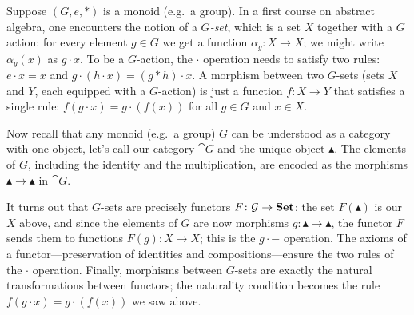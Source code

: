 \documentclass[Book-Poly]{subfiles}
\begin{document}
\begin{example}
Suppose $(G,e,*)$ is a monoid (e.g.\ a group). In a first course on abstract algebra, one encounters the notion of a \emph{$G$-set}, which is a set $X$ together with a $G$ action: for every element $g\in G$ we get a function $\alpha_g\colon X\to X$; we might write $\alpha_g(x)$ as $g\cdot x$. To be a $G$-action, the $\cdot$ operation needs to satisfy two rules: $e\cdot x=x$ and $g\cdot(h\cdot x)=(g*h)\cdot x$. A morphism between two $G$-sets (sets $X$ and $Y$, each equipped with a $G$-action) is just a function $f\colon X\to Y$ that  satisfies a single rule: $f(g\cdot x)=g\cdot (f(x))$ for all $g\in G$ and $x\in X$.

Now recall that any monoid (e.g.\ a group) $G$ can be understood as a category with one object, let's call our category $\cat{G}$ and the unique object $\blacktriangle$. The elements of $G$, including the identity and the multiplication, are encoded as the morphisms $\blacktriangle\to\blacktriangle$ in $\cat{G}$. 

It turns out that $G$-sets are precisely functors $F\colon\mathcal{G}\to\mathbf{Set}$: the set $F(\blacktriangle)$ is our $X$ above, and since the elements of $G$ are now morphisms $g\colon \blacktriangle\to\blacktriangle$, the functor $F$ sends them to functions $F(g)\colon X\to X$; this is the $g\cdot-$ operation. The axioms of a functor---preservation of identities and compositions---ensure the two rules of the $\cdot$ operation. Finally, morphisms between $G$-sets are exactly the natural transformations between functors; the naturality condition becomes the rule $f(g\cdot x)=g\cdot (f(x))$ we saw above.

\end{example}
\end{document}
